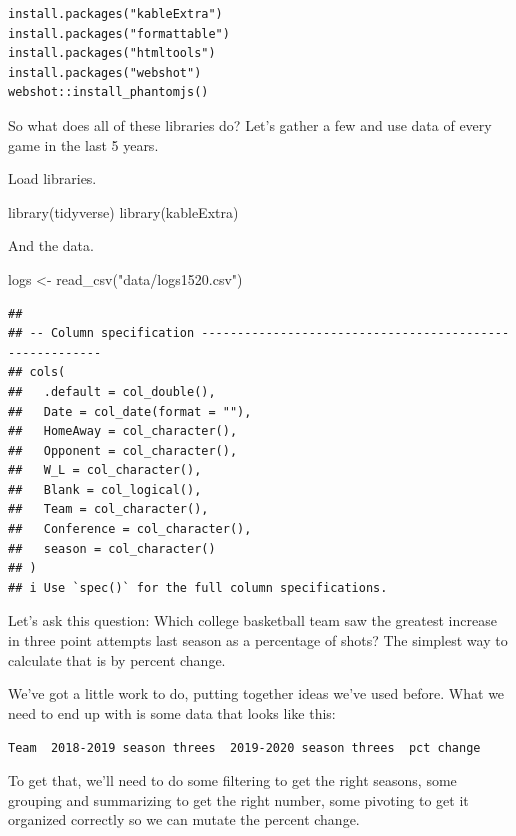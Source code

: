 \documentclass[
]{book}
\newenvironment{Shaded}{\begin{snugshade}}{\end{snugshade}}
\newcommand{\FunctionTok}[1]{\textcolor[rgb]{0.00,0.00,0.00}{#1}}
\newcommand{\NormalTok}[1]{#1}
\newcommand{\OtherTok}[1]{\textcolor[rgb]{0.56,0.35,0.01}{#1}}
\newcommand{\StringTok}[1]{\textcolor[rgb]{0.31,0.60,0.02}{#1}}
\begin{document}
\begin{verbatim}
install.packages("kableExtra")
install.packages("formattable")
install.packages("htmltools")
install.packages("webshot")
webshot::install_phantomjs()
\end{verbatim}

So what does all of these libraries do? Let's gather a few and use data of every game in the last 5 years.

Load libraries.

\begin{Shaded}
\begin{Highlighting}[]
\FunctionTok{library}\NormalTok{(tidyverse)}
\FunctionTok{library}\NormalTok{(kableExtra)}
\end{Highlighting}
\end{Shaded}

And the data.

\begin{Shaded}
\begin{Highlighting}[]
\NormalTok{logs }\OtherTok{\textless{}{-}} \FunctionTok{read\_csv}\NormalTok{(}\StringTok{"data/logs1520.csv"}\NormalTok{)}
\end{Highlighting}
\end{Shaded}

\begin{verbatim}
## 
## -- Column specification --------------------------------------------------------
## cols(
##   .default = col_double(),
##   Date = col_date(format = ""),
##   HomeAway = col_character(),
##   Opponent = col_character(),
##   W_L = col_character(),
##   Blank = col_logical(),
##   Team = col_character(),
##   Conference = col_character(),
##   season = col_character()
## )
## i Use `spec()` for the full column specifications.
\end{verbatim}

Let's ask this question: Which college basketball team saw the greatest increase in three point attempts last season as a percentage of shots? The simplest way to calculate that is by percent change.

We've got a little work to do, putting together ideas we've used before. What we need to end up with is some data that looks like this:

\texttt{Team\ \textbar{}\ 2018-2019\ season\ threes\ \textbar{}\ 2019-2020\ season\ threes\ \textbar{}\ pct\ change}

To get that, we'll need to do some filtering to get the right seasons, some grouping and summarizing to get the right number, some pivoting to get it organized correctly so we can mutate the percent change.
\end{document}
